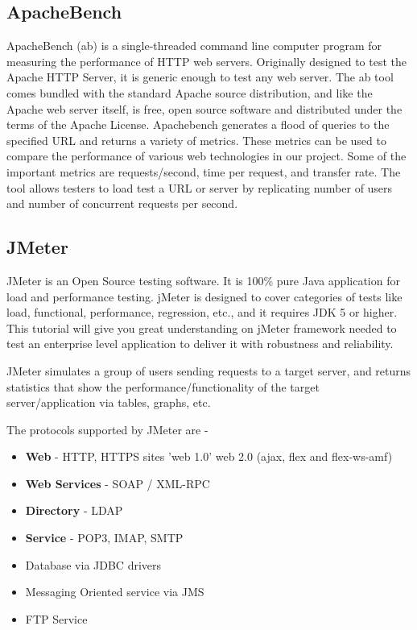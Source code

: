 \documentclass[../thesis.tex]{subfiles}
\begin{document}
\subsection{ApacheBench}
ApacheBench (ab) is a single-threaded command line computer program for measuring the performance of HTTP web servers. Originally designed to test the Apache HTTP Server, it is generic enough to test any web server.
The ab tool comes bundled with the standard Apache source distribution, and like the Apache web server itself, is free, open source software and distributed under the terms of the Apache License. \cite{ab}
Apachebench generates a flood of queries to the specified URL and returns a variety of metrics. These metrics can be used to compare the performance of various web technologies in our project. Some of the important metrics are requests/second, time per request, and transfer rate. The tool allows testers to load test a URL or server by replicating number of users and number of concurrent requests per second.

\subsection{JMeter}
JMeter is an Open Source testing software. It is 100\% pure Java application for load and performance testing. jMeter is designed to cover categories of tests like load, functional, performance, regression, etc., and it requires JDK 5 or higher. This tutorial will give you great understanding on jMeter framework needed to test an enterprise level application to deliver it with robustness and reliability. \cite{jmeter}
\newline
    
JMeter simulates a group of users sending requests to a target server, and returns statistics that show the performance/functionality of the target server/application via tables, graphs, etc.
\newline
    
    
The protocols supported by JMeter are -

\begin{itemize}
	\item \textbf{Web} - HTTP, HTTPS sites 'web 1.0' web 2.0 (ajax, flex and flex-ws-amf)
  
	\item \textbf{Web Services} - SOAP / XML-RPC

	\item \textbf{Directory} - LDAP
   
	\item \textbf{Service} - POP3, IMAP, SMTP
  
	\item Database via JDBC drivers
    
	\item Messaging Oriented service via JMS
   
	\item FTP Service
\end{itemize}
\end{document}
